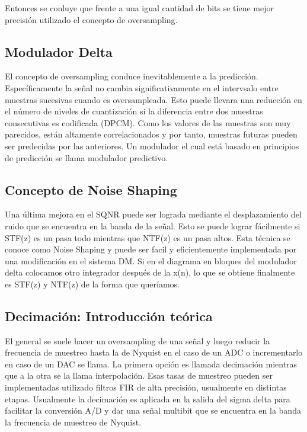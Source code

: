 \documentclass[assd_tp3_main.tex]{subfiles}
\begin{document}
Entonces se conluye que frente a una igual cantidad de bits se tiene mejor precisión utilizado el concepto de oversampling.


\subsection{Modulador Delta}

El concepto de oversampling conduce inevitablemente a la predicción. Específicamente la señal no cambia significativamente en el intervsalo entre muestras sucesivas cuando es oversampleada. Esto puede llevara una reducción en el número de niveles de cuantización si la diferencia entre dos muestras consecutivas es codificada (DPCM). Como los valores de las muestras son muy parecidos, están altamente correlacionados y por tanto, muestras futuras pueden ser predecidas por las anteriores.
Un modulador el cual está basado en principios de predicción se llama modulador predictivo.  



\subsection{Concepto de Noise Shaping}
Una última mejora en el SQNR puede ser lograda mediante el desplazamiento del ruido que se encuentra en la banda de la señal. Esto se puede lograr fácilmente si STF(z) es un pasa todo mientras que NTF(z) es un pasa altos.
Esta técnica se conoce como Noise Shaping y puede ser facil y eficientemente implementada por una modificación en el sistema DM. Si en el diagrama en bloques del modulador delta colocamos otro integrador después de la x(n), lo que se obtiene finalmente es STF(z) y NTF(z) de la forma que queríamos.
  
\subsection{Decimación: Introducción teórica}
El general se suele hacer un oversampling de una señal y luego reducir la frecuencia de muestreo hasta la de Nyquist en el caso de un ADC o incrementarlo en caso de un DAC se llama. La primera opción es llamada decimación mientras que a la otra se la llama interpolación.
Esas tasas de muestreo pueden ser implementadas utilizado filtros FIR de alta precisión, usualmente en distintas etapas.
Usualmente la decimación es aplicada en la salida del sigma delta para facilitar la conversión A/D y dar una señal multibit que se encuentra en la banda la frecuencia de muestreo de Nyquist.
\end{document}
